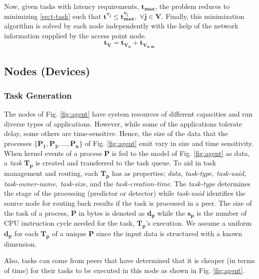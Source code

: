 Now, given tasks with latency requirements, $ \bm{t_{max}} $, 
the problem reduces to minimizing \eqref{eq:t-task} such that 
${ \bm{t^{v_j}\leq t_{max}^{v_j}, \; \forall j \in V }} $. 
Finally, this minimization algorithm is solved by each 
node independently with the help of the network information 
supplied by the access point node.
\begin{equation}
\bm{t_{V} = t_{V_{n}} + t_{V_{n,m}} } 
\label{eq:t-task}
\end{equation}
\subsection{Nodes (Devices)}
\subsubsection{Task Generation}
\label{subsec:task-generation}
The nodes of Fig. \ref{fig:agent} have 
system resources of different capacities and run diverse 
types of applications. However, while some of the 
applications tolerate delay, some others are time-sensitive. 
Hence, the size of the data that the processes $ 
\bm{\{P_1,P_2,...,P_n\}} $ of 
Fig. \ref{fig:agent} emit vary in size and time sensitivity. 
When kernel events of a process $ \bm{P} $ is fed to the 
model of Fig. \ref{fig:agent} as data, a \emph{task} $ 
\bm{T_{p}} $ is created and transferred to the task queue. To 
aid in task management and routing, each $ \bm{T_p} $ has as 
properties; \emph{data, task-type, task-uuid, 
	task-owner-name, task-size}, and the 
\emph{task-creation-time}. The 
\emph{task-type} determines the stage of the processing 
(predictor or detector) while \emph{task-uuid} identifies the 
source node for routing back results if the task is 
processed in a peer. The size of the task of a process, $ 
\bm{P} $ in bytes is denoted 
as $ \bm{d_p} $ while the $ \bm{s_{p}} $ is the number of CPU 
instruction 
cycle 
needed for the task, $ \bm{T_p} $'s execution. We assume a 
uniform $ 
\bm{d_p} $ for each $ \bm{T_p} $ of a unique $ \bm{P} $ since 
the input data is structured with a known dimension.
\par
Also, tasks can come from peers that have determined that it 
is cheaper (in terms of time) for their tasks to be executed 
in this node as shown in Fig. \ref{fig:agent}.  
